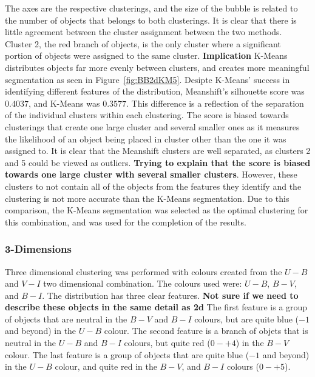 The axes are the respective clusterings, and the size of the bubble is related to the number of objects that belongs to both clusterings.
It is clear that there is little agreement between the cluster assignment between the two methods.
Cluster 2, the red branch of objects, is the only cluster where a significant portion of objects were assigned to the same cluster. \textbf{Implication}
K-Means distributes objects far more evenly between clusters, and creates more meaningful segmentation as seen in Figure~\ref{fig:BB2dKM5}.
Desipte K-Means' success in identifying different features of the distribution, Meanshift's silhouette score was $0.4037$, and K-Means was $0.3577$.
This difference is a reflection of the separation of the individual clusters within each clustering.
The score is biased towards clusterings that create one large cluster and several smaller ones as it measures the likelihood of an object being placed in cluster other than the one it was assigned to.
It is clear that the Meanshift clusters are well separated, as clusters 2 and 5 could be viewed as outliers.
\textbf{Trying to explain that the score is biased towards one large cluster with several smaller clusters}.
However, these clusters to not contain all of the objects from the features they identify and the clustering is not more accurate than the K-Means segmentation.
Due to this comparison, the K-Means segmentation was selected as the optimal clustering for this combination, and was used for the completion of the results.

\subsubsection{3-Dimensions}
Three dimensional clustering was performed with colours created from the $U - B$ and $V - I$ two dimensional combination.
The colours used were: $U - B$, $B - V$, and $B - I$.
The distribution has three clear features. 
\textbf{Not sure if we need to describe these objects in the same detail as 2d}
The first feature is a group of objects that are neutral in the $B - V$ and $B - I$ colours, but are quite blue ($-1$ and beyond) in the $U - B$ colour.
The second feature is a branch of objets that is neutral in the $U - B$ and $B - I$ colours, but quite red ($0 - +4$) in the $B - V$ colour.
The last feature is a group of objects that are quite blue ($-1$ and beyond) in the $U - B$ colour, and quite red in the $B - V$, and $B - I$ colours ($0 - +5$).

